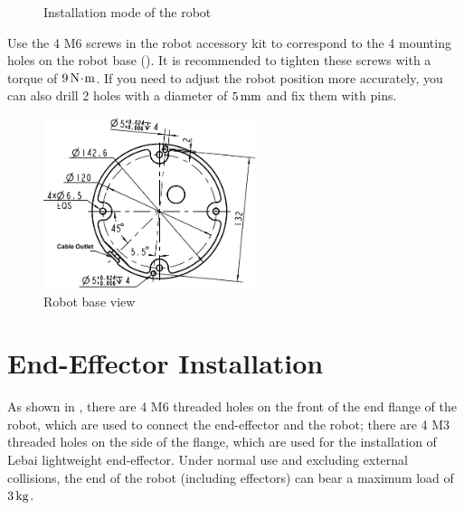 \begin{figure}[htb!]
{\begin{minipage}[b]{0.3\textwidth}
    	\end{minipage}
    }
    \caption{Installation mode of the robot}
    \label{fig:机器人安装方式}
\end{figure}



Use the 4 M6 screws in the robot accessory kit to correspond to the 4 mounting holes on the robot base (). It is recommended to tighten these screws with a torque of $9\,\mathrm{N\!\cdot\! m}$. If you need to adjust the robot position more accurately, you can also drill 2 holes with a diameter of $5 \,\mathrm{mm}$ and fix them with pins.


\begin{figure}[htb!]
    \centering
    \includegraphics[height=5cm]{en/image/bottom_surface.pdf}
    \caption{Robot base view}
    \label{fig:机器人底座视图}
\end{figure}



\clearpage

\section{End-Effector Installation}

As shown in , there are 4 M6 threaded holes on the front of the end flange of the robot, which are used to connect the end-effector and the robot;
there are 4 M3 threaded holes on the side of the flange, which are used for the installation of Lebai lightweight end-effector. Under normal use and excluding external collisions, the end of the robot (including effectors) can bear a maximum load of $3\,\mathrm{kg}$.

